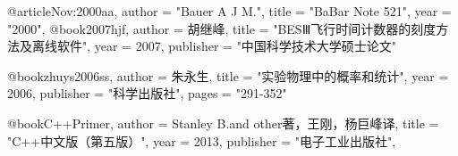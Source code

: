 @article{Nov:2000aa,
      author         = "Bauer A J M.",
      title          = "{BaBar Note 521}",
      year           = "2000",
}
@book{2007hjf,
      author = {{胡继峰}},
      title = "{BESⅢ飞行时间计数器的刻度方法及离线软件}",
      year = {2007},
      publisher = "中国科学技术大学硕士论文"
}

@book{zhuys2006ss,
      author = {{朱永生}},
      title = "实验物理中的概率和统计",
      year = {2006},
      publisher = "科学出版社",
      pages     = "291-352"
}

@book{C++Primer,
      author = {{Stanley B.and other著，王刚，杨巨峰译}},
      title = "C++中文版（第五版）",
      year = {2013},
      publisher = "电子工业出版社",
}